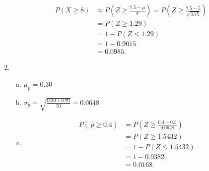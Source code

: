 \begin{enumerate}[Q 1.]
\begin{align*}
P(X\geq 8) &\approx P\left(Z\geq \frac{7.5-\mu}{\sigma}\right) =P\left(Z\geq \frac{7.5-5}{\sqrt{3.75}}\right) \\
&=P(Z\geq 1.29)\\
&=1-P(Z\leq 1.29)\\
&=1-0.9015\\
&=0.0985.
\end{align*}
\item 
\sol
\begin{enumerate}[(a)]
\item $\mu_{\hat{p}} = 0.30$
\item $\sigma_{\hat{p}} = \sqrt{\frac{0.30\times 0.70}{50}} = 0.0648$
\item 
\begin{align*}
P(\, \hat{p} \geq 0.4) &= P\left(Z \geq \frac{0.4-0.3}{0.0648}\right) \\
&= P(Z \geq 1.5432)\\&=1-P(Z \leq 1.5432) \\
&= 1-0.9382\\&=0.0168.
\end{align*}
\end{enumerate}

\end{enumerate} 

